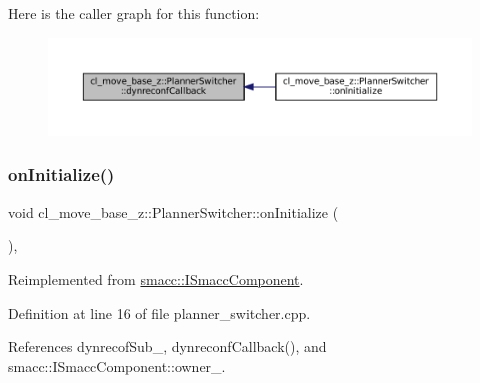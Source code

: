 Here is the caller graph for this function\+:
\nopagebreak
\begin{figure}[H]
\begin{center}
\leavevmode
\includegraphics[width=350pt]{classcl__move__base__z_1_1PlannerSwitcher_ad9371bd8d62600ef874e8914c3ec177b_icgraph}
\end{center}
\end{figure}
\mbox{\label{classcl__move__base__z_1_1PlannerSwitcher_a36bc2b9788f03a1ca02b954c625ef4c5}} 
\subsubsection{\texorpdfstring{on\+Initialize()}{onInitialize()}}
{\footnotesize\ttfamily void cl\+\_\+move\+\_\+base\+\_\+z\+::\+Planner\+Switcher\+::on\+Initialize (\begin{DoxyParamCaption}{ }\end{DoxyParamCaption})\hspace{0.3cm}{\ttfamily [override]}, {\ttfamily [virtual]}}



Reimplemented from \hyperlink{classsmacc_1_1ISmaccComponent_ae6f71d008db12553912e9436184b9e65}{smacc\+::\+I\+Smacc\+Component}.



Definition at line 16 of file planner\+\_\+switcher.\+cpp.



References dynrecof\+Sub\+\_\+, dynreconf\+Callback(), and smacc\+::\+I\+Smacc\+Component\+::owner\+\_\+.


